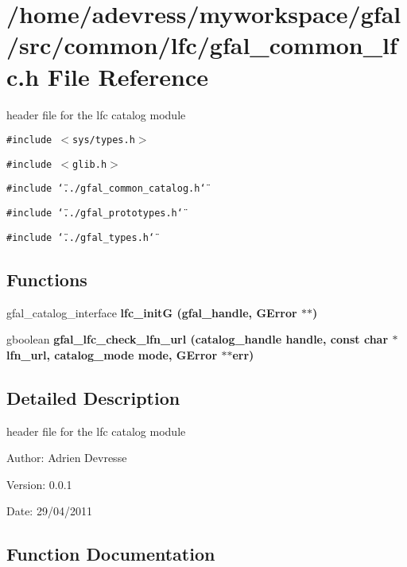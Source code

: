 \section{/home/adevress/myworkspace/gfal/src/common/lfc/gfal\_\-common\_\-lfc.h File Reference}
\label{gfal__common__lfc_8h}
header file for the lfc catalog module 

{\tt \#include $<$sys/types.h$>$}\par
{\tt \#include $<$glib.h$>$}\par
{\tt \#include \char`\"{}../gfal\_\-common\_\-catalog.h\char`\"{}}\par
{\tt \#include \char`\"{}../gfal\_\-prototypes.h\char`\"{}}\par
{\tt \#include \char`\"{}../gfal\_\-types.h\char`\"{}}\par
\subsection*{Functions}
\begin{CompactItemize}
\item 
gfal\_\-catalog\_\-interface \bf{lfc\_\-init\-G} (gfal\_\-handle, GError $\ast$$\ast$)
\item 
gboolean \bf{gfal\_\-lfc\_\-check\_\-lfn\_\-url} (catalog\_\-handle handle, const char $\ast$lfn\_\-url, catalog\_\-mode mode, GError $\ast$$\ast$err)
\end{CompactItemize}


\subsection{Detailed Description}
header file for the lfc catalog module 

\begin{Desc}
\item[Author:]Adrien Devresse \end{Desc}
\begin{Desc}
\item[Version:]0.0.1 \end{Desc}
\begin{Desc}
\item[Date:]29/04/2011 \end{Desc}


\subsection{Function Documentation}
